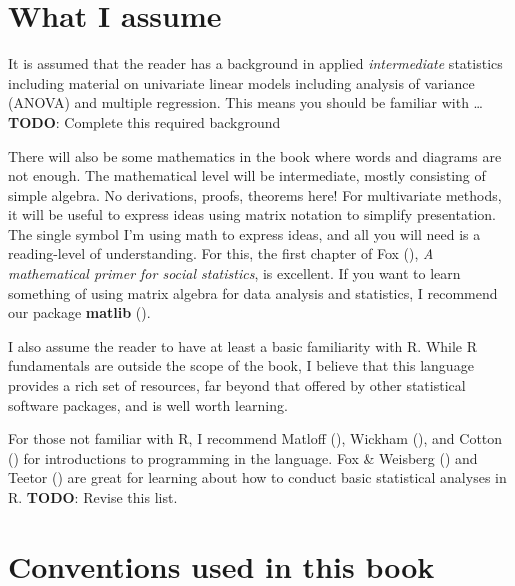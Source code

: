\documentclass[
  letterpaper,
  10pt,
  krantz2]{krantz}
\begin{document}
\section*{What I assume}\label{what-i-assume}


It is assumed that the reader has a background in applied
\emph{intermediate} statistics including material on univariate linear
models including analysis of variance (ANOVA) and multiple regression.
This means you should be familiar with \ldots{} \textbf{TODO}: Complete
this required background

There will also be some mathematics in the book where words and diagrams
are not enough. The mathematical level will be intermediate, mostly
consisting of simple algebra. No derivations, proofs, theorems here! For
multivariate methods, it will be useful to express ideas using matrix
notation to simplify presentation. The single symbol I'm using math to
express ideas, and all you will need is a reading-level of
understanding. For this, the first chapter of Fox
(), \emph{A mathematical primer for social
statistics}, is excellent. If you want to learn something of using
matrix algebra for data analysis and statistics, I recommend our package
\textbf{matlib} ().

I also assume the reader to have at least a basic familiarity with R.
While R fundamentals are outside the scope of the book, I believe that
this language provides a rich set of resources, far beyond that offered
by other statistical software packages, and is well worth learning.

For those not familiar with R, I recommend Matloff
(), Wickham
(), and Cotton
() for introductions to programming in
the language. Fox \& Weisberg ()
and Teetor () are great for learning
about how to conduct basic statistical analyses in R. \textbf{TODO}:
Revise this list.

\section*{Conventions used in this
book}\label{conventions-used-in-this-book}
\end{document}
